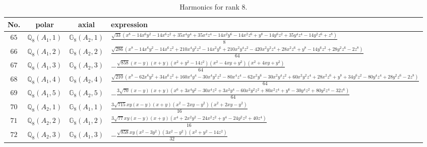 \documentclass[fleqn,8pt,landscape]{jsarticle}
\begin{document}
\begin{table}[ht!]
\begin{center}
\caption{Harmonics for rank 8.}
\renewcommand{\arraystretch}{1.3}
\begin{tabular}{cccl} \hline \hline
No. & polar & axial & expression \\ \hline
$ 65 $ & $ \mathbb{Q}_{8}(A_{1},1) $ & $ \mathbb{G}_{8}(A_{2},1) $ & $ \frac{\sqrt{33} \left(x^{8} - 14 x^{6} y^{2} - 14 x^{6} z^{2} + 35 x^{4} y^{4} + 35 x^{4} z^{4} - 14 x^{2} y^{6} - 14 x^{2} z^{6} + y^{8} - 14 y^{6} z^{2} + 35 y^{4} z^{4} - 14 y^{2} z^{6} + z^{8}\right)}{8} $ \\
$ 66 $ & $ \mathbb{Q}_{8}(A_{1},2) $ & $ \mathbb{G}_{8}(A_{2},2) $ & $ \frac{\sqrt{286} \left(x^{8} - 14 x^{6} y^{2} - 14 x^{6} z^{2} + 210 x^{4} y^{2} z^{2} - 14 x^{2} y^{6} + 210 x^{2} y^{4} z^{2} - 420 x^{2} y^{2} z^{4} + 28 x^{2} z^{6} + y^{8} - 14 y^{6} z^{2} + 28 y^{2} z^{6} - 2 z^{8}\right)}{64} $ \\
$ 67 $ & $ \mathbb{Q}_{8}(A_{1},3) $ & $ \mathbb{G}_{8}(A_{2},3) $ & $ - \frac{\sqrt{858} \left(x - y\right) \left(x + y\right) \left(x^{2} + y^{2} - 14 z^{2}\right) \left(x^{2} - 4 x y + y^{2}\right) \left(x^{2} + 4 x y + y^{2}\right)}{64} $ \\
$ 68 $ & $ \mathbb{Q}_{8}(A_{1},4) $ & $ \mathbb{G}_{8}(A_{2},4) $ & $ \frac{\sqrt{210} \left(x^{8} - 62 x^{6} y^{2} + 34 x^{6} z^{2} + 160 x^{4} y^{4} - 30 x^{4} y^{2} z^{2} - 80 x^{4} z^{4} - 62 x^{2} y^{6} - 30 x^{2} y^{4} z^{2} + 60 x^{2} y^{2} z^{4} + 28 x^{2} z^{6} + y^{8} + 34 y^{6} z^{2} - 80 y^{4} z^{4} + 28 y^{2} z^{6} - 2 z^{8}\right)}{64} $ \\
$ 69 $ & $ \mathbb{Q}_{8}(A_{1},5) $ & $ \mathbb{G}_{8}(A_{2},5) $ & $ - \frac{3 \sqrt{70} \left(x - y\right) \left(x + y\right) \left(x^{6} + 3 x^{4} y^{2} - 30 x^{4} z^{2} + 3 x^{2} y^{4} - 60 x^{2} y^{2} z^{2} + 80 x^{2} z^{4} + y^{6} - 30 y^{4} z^{2} + 80 y^{2} z^{4} - 32 z^{6}\right)}{64} $ \\
$ 70 $ & $ \mathbb{Q}_{8}(A_{2},1) $ & $ \mathbb{G}_{8}(A_{1},1) $ & $ \frac{3 \sqrt{715} x y \left(x - y\right) \left(x + y\right) \left(x^{2} - 2 x y - y^{2}\right) \left(x^{2} + 2 x y - y^{2}\right)}{16} $ \\
$ 71 $ & $ \mathbb{Q}_{8}(A_{2},2) $ & $ \mathbb{G}_{8}(A_{1},2) $ & $ \frac{3 \sqrt{77} x y \left(x - y\right) \left(x + y\right) \left(x^{4} + 2 x^{2} y^{2} - 24 x^{2} z^{2} + y^{4} - 24 y^{2} z^{2} + 40 z^{4}\right)}{16} $ \\
$ 72 $ & $ \mathbb{Q}_{8}(A_{2},3) $ & $ \mathbb{G}_{8}(A_{1},3) $ & $ - \frac{\sqrt{858} x y \left(x^{2} - 3 y^{2}\right) \left(3 x^{2} - y^{2}\right) \left(x^{2} + y^{2} - 14 z^{2}\right)}{32} $ \\

\end{tabular}
\end{center}
\end{table}
\end{document}
